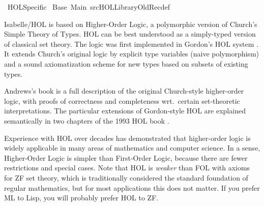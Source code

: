 %
\begin{isabellebody}%
\def\isabellecontext{HOL{\isaliteral{5F}{\isacharunderscore}}Specific}%
%
\isadelimtheory
%
\endisadelimtheory
%
\isatagtheory
{}\isamarkupfalse%
\ HOL{}Specific\isanewline
{}\ Base\ Main\ {}{}{}{}src{}HOL{}Library{}Old{}Recdef{}\isanewline
{}%
\endisatagtheory
{\isafoldtheory}%
%
\isadelimtheory
%
\endisadelimtheory
%
\isamarkuptrue%
%
\isamarkuptrue%
%
\begin{isamarkuptext}%
Isabelle/HOL is based on Higher-Order Logic, a polymorphic
  version of Church's Simple Theory of Types.  HOL can be best
  understood as a simply-typed version of classical set theory.  The
  logic was first implemented in Gordon's HOL system
  \cite{mgordon-hol}.  It extends Church's original logic
  \cite{church40} by explicit type variables (naive polymorphism) and
  a sound axiomatization scheme for new types based on subsets of
  existing types.

  Andrews's book \cite{andrews86} is a full description of the
  original Church-style higher-order logic, with proofs of correctness
  and completeness wrt.\ certain set-theoretic interpretations.  The
  particular extensions of Gordon-style HOL are explained semantically
  in two chapters of the 1993 HOL book \cite{pitts93}.

  Experience with HOL over decades has demonstrated that higher-order
  logic is widely applicable in many areas of mathematics and computer
  science.  In a sense, Higher-Order Logic is simpler than First-Order
  Logic, because there are fewer restrictions and special cases.  Note
  that HOL is \emph{weaker} than FOL with axioms for ZF set theory,
  which is traditionally considered the standard foundation of regular
  mathematics, but for most applications this does not matter.  If you
  prefer ML to Lisp, you will probably prefer HOL to ZF.


\end{isamarkuptext}
\end{isabellebody}
